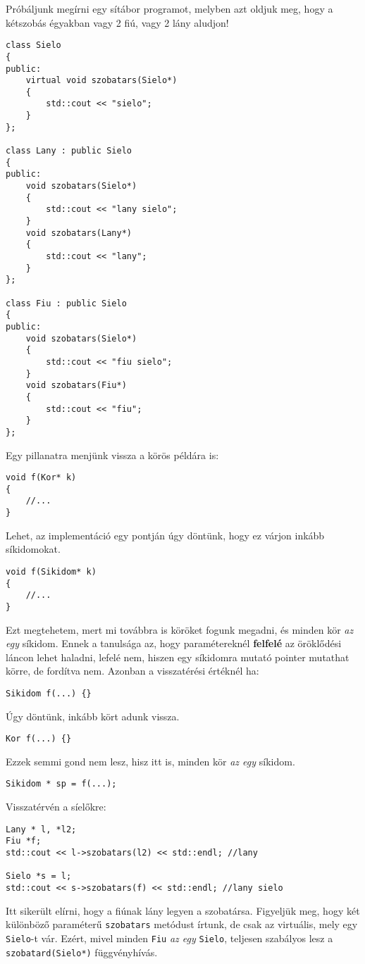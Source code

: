 \documentclass[a4paper,11.5pt]{article}
\begin{document}
	Próbáljunk megírni egy sítábor programot, melyben azt oldjuk meg, hogy a kétszobás égyakban vagy 2 fiú, vagy 2 lány aludjon!
	
	\begin{lstlisting}
class Sielo
{
public:
	virtual void szobatars(Sielo*)
	{
		std::cout << "sielo";
	}
};

class Lany : public Sielo
{
public:
	void szobatars(Sielo*)
	{
		std::cout << "lany sielo";
	}
	void szobatars(Lany*)
	{
		std::cout << "lany";
	}
};

class Fiu : public Sielo
{
public:
	void szobatars(Sielo*)
	{
		std::cout << "fiu sielo";
	}
	void szobatars(Fiu*)
	{
		std::cout << "fiu";
	}
};
	\end{lstlisting}
	Egy pillanatra menjünk vissza a körös példára is:
	\begin{lstlisting}
void f(Kor* k)
{
	//...
}
	\end{lstlisting}
	Lehet, az implementáció egy pontján úgy döntünk, hogy ez várjon inkább síkidomokat.
	\begin{lstlisting}
void f(Sikidom* k)
{
	//...
}
	\end{lstlisting}
	Ezt megtehetem, mert mi továbbra is köröket fogunk megadni, és minden kör \textit{az egy} síkidom. Ennek a tanulsága az, hogy paramétereknél \textbf{felfelé} az öröklődési láncon lehet haladni, lefelé nem, hiszen egy síkidomra mutató pointer mutathat körre, de fordítva nem. Azonban a visszatérési értéknél ha:
	\begin{lstlisting}
Sikidom f(...) {}
	\end{lstlisting}
	Úgy döntünk, inkább kört adunk vissza.
	\begin{lstlisting}
Kor f(...) {}
	\end{lstlisting}
	Ezzek semmi gond nem lesz, hisz itt is, minden kör \textit{az egy} síkidom.
	\begin{lstlisting}
Sikidom * sp = f(...);
	\end{lstlisting}
	\medskip
	
	Visszatérvén a síelőkre:
	\begin{lstlisting}
Lany * l, *l2;
Fiu *f;
std::cout << l->szobatars(l2) << std::endl; //lany

Sielo *s = l;
std::cout << s->szobatars(f) << std::endl; //lany sielo
	\end{lstlisting} 
	Itt sikerült elírni, hogy a fiúnak lány legyen a szobatársa. Figyeljük meg, hogy két különböző paraméterű \texttt{szobatars} metódust írtunk, de csak az virtuális, mely egy \texttt{Sielo}-t vár. Ezért, mivel minden \texttt{Fiu} \textit{az egy} \texttt{Sielo}, teljesen szabályos lesz a \texttt{szobatard(Sielo*)} függvényhívás.
	
\end{document}
